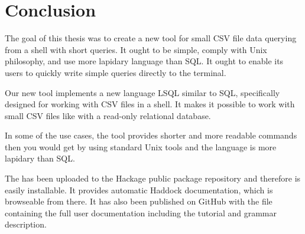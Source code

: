 \chapter*{Conclusion}

The goal of this thesis was to create a new tool for small CSV file data querying from a shell with short queries.
It ought to be simple, comply with Unix philosophy, and use more lapidary language than SQL.
It ought to enable its users to quickly write simple queries directly to the terminal.

Our new tool  implements a new language LSQL similar to
SQL, specifically designed for working with CSV files in a shell. It makes it possible to work with small CSV files like with a read-only relational database.

In some of the use cases, the tool provides shorter and more readable commands then you would get by using standard Unix tools and the 
language is more lapidary than SQL.

The  has been uploaded to the Hackage public package repository and therefore is easily installable. 
It provides automatic Haddock documentation, which is browseable from there. 
It has also been published on GitHub with the  file containing the full user documentation including the tutorial and grammar description.

